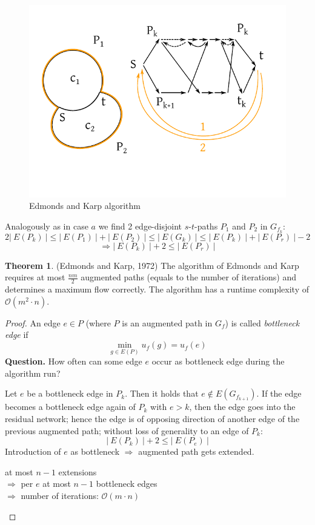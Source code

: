 \documentclass[a4paper]{article}
\theoremstyle{definition}
\newtheorem{theorem}{Theorem}
\newcommand{\card}[1]{\left|\:\!#1\:\!\right|}
\newcommand{\gath}[2]{$#1$-$#2$-path} %
\begin{document}
\begin{figure}[ht]
 \begin{center}
  \includegraphics{img/ek_algorithm2.pdf}
  \caption{Edmonds and Karp algorithm}
 \end{center}
\end{figure}

Analogously as in case $a$ we find 2 edge-disjoint \gath sts $P_1$ and $P_2$ in $G_{f_k}$:
\[
  2 \card{E(P_k)} \leq \card{E(P_1)} + \card{E(P_2)} \leq \card{E(G_k)} \leq \card{E(P_k)} + \card{E(P_r)} - 2
\] \[
  \Rightarrow \card{E(P_k)} + 2 \leq \card{E(P_r)}
\]

\begin{theorem}\label{satz-4.6}
  (Edmonds and Karp, 1972)
  The algorithm of Edmonds and Karp requires at most $\frac{nm}2$ augmented paths (equals to the number of iterations) and determines a maximum flow correctly. The algorithm has a runtime complexity of $\mathcal{O}(m^2 \cdot n)$.
\end{theorem}

\begin{proof}
  An edge $e \in P$ (where $P$ is an augmented path in $G_f$) is called \emph{bottleneck edge} if
  \[
    \min_{g \in E(P)} u_f(g) = u_f(e)
  \]
  \textbf{Question.}
    How often can some edge $e$ occur as bottleneck edge during the algorithm run?

    Let $e$ be a bottleneck edge in $P_k$. Then it holds that $e \notin E(G_{f_{k+1}})$. If the edge becomes a bottleneck edge again of $P_k$ with $e > k$, then the edge goes into the residual network; hence the edge is of opposing direction of another edge of the previous augmented path; without loss of generality to an edge of $P_k$:
    \[
      \card{E(P_k)} + 2 \leq \card{E(P_e)}
    \]
    Introduction of $e$ as bottleneck $\Rightarrow$ augmented path gets extended.
    \begin{center}
      at most $n - 1$ extensions \\
      $\Rightarrow$ per $e$ at most $n-1$ bottleneck edges \\
      $\Rightarrow$ number of iterations: $\mathcal{O}(m\cdot n)$
    \end{center}
\end{proof}
\end{document}
